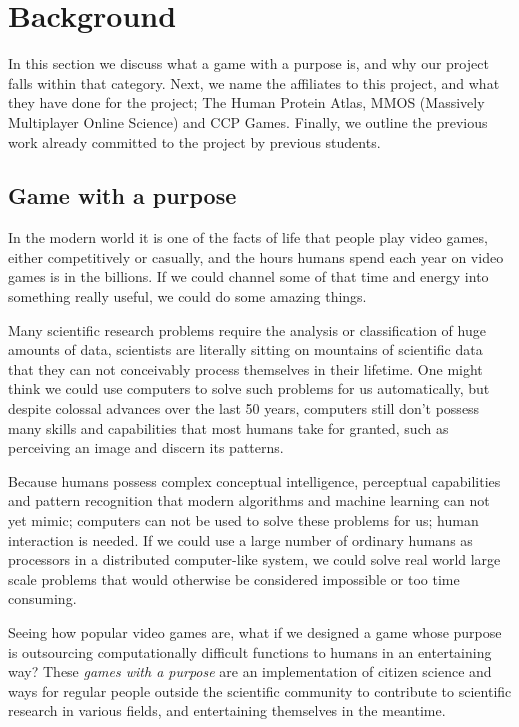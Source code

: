 \section{Background}\label{sec:background}
	In this section we discuss what a game with a purpose is, and why our project falls within that category. Next, we name the affiliates to this project, and what they have done for the project; The Human Protein Atlas, MMOS (Massively Multiplayer Online Science) and CCP Games. Finally, we outline the previous work already committed to the project by previous students.

\subsection{Game with a purpose}
	In the modern world it is one of the facts of life that people play video games, either competitively or casually, and the hours humans spend each year on video games is in the billions. If we could channel some of that time and energy into something really useful, we could do some amazing things.

	Many scientific research problems require the analysis or classification of huge amounts of data, scientists are literally sitting on mountains of scientific data that they can not conceivably process themselves in their lifetime. One might think we could use computers to solve such problems for us automatically, but despite colossal advances over the last 50 years, computers still don't possess many skills and capabilities that most humans take for granted, such as perceiving an image and discern its patterns.

	Because humans possess complex conceptual intelligence, perceptual capabilities and pattern recognition that modern algorithms and machine learning can not yet mimic; computers can not be used to solve these problems for us; human interaction is needed. If we could use a large number of ordinary humans as processors in a distributed computer-like system, we could solve real world large scale problems that would otherwise be considered impossible or too time consuming.

	Seeing how popular video games are, what if we designed a game whose purpose is outsourcing computationally difficult functions to humans in an entertaining way? These \emph{games with a purpose} are an implementation of citizen science and ways for regular people outside the scientific community to contribute to scientific research in various fields, and entertaining themselves in the meantime.

